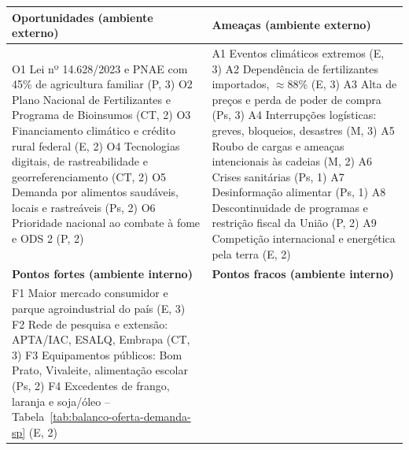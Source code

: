 \documentclass[
	12pt,				%
	openright,			%
	oneside,			%
	a4paper,			%
	chapter=TITLE,		%
	section=TITLE,		%
	english,			%
	french,				%
	spanish,			%
	brazil,				%
 ]{abntex2}
\begin{document}
\begin{quadro}[!htbp]
\centering
\caption{Sumário da análise SWOT: variáveis numeradas, Expressão e peso}
\label{qua:sumario-swot}
\footnotesize
\renewcommand{\arraystretch}{1.05}
\setlength{\tabcolsep}{3pt}
\begin{tabularx}{\textwidth}{|>{\raggedright\arraybackslash}X|>{\raggedright\arraybackslash}X|}
\hline
\textbf{Oportunidades (ambiente externo)} & \textbf{Ameaças (ambiente externo)} \\
\hline
O1 Lei nº 14.628/2023 e PNAE com 45\% de agricultura familiar (P, 3) \newline
O2 Plano Nacional de Fertilizantes e Programa de Bioinsumos (CT, 2) \newline
O3 Financiamento climático e crédito rural federal (E, 2) \newline
O4 Tecnologias digitais, de rastreabilidade e georreferenciamento (CT, 2) \newline
O5 Demanda por alimentos saudáveis, locais e rastreáveis (Ps, 2) \newline
O6 Prioridade nacional ao combate à fome e ODS 2 (P, 2)
&
A1 Eventos climáticos extremos (E, 3) \newline
A2 Dependência de fertilizantes importados, $\approx$88\% (E, 3) \newline
A3 Alta de preços e perda de poder de compra (Ps, 3) \newline
A4 Interrupções logísticas: greves, bloqueios, desastres (M, 3) \newline
A5 Roubo de cargas e ameaças intencionais às cadeias (M, 2) \newline
A6 Crises sanitárias (Ps, 1) \quad A7 Desinformação alimentar (Ps, 1) \newline
A8 Descontinuidade de programas e restrição fiscal da União (P, 2) \newline
A9 Competição internacional e energética pela terra (E, 2) \\
\hline
\textbf{Pontos fortes (ambiente interno)} & \textbf{Pontos fracos (ambiente interno)} \\
\hline
F1 Maior mercado consumidor e parque agroindustrial do país (E, 3) \newline
F2 Rede de pesquisa e extensão: APTA/IAC, ESALQ, Embrapa (CT, 3) \newline
F3 Equipamentos públicos: Bom Prato, Vivaleite, alimentação escolar (Ps, 2) \newline
F4 Excedentes de frango, laranja e soja/óleo -- Tabela~\ref{tab:balanco-oferta-demanda-sp} (E, 2) \newline

\end{tabularx}
\end{quadro}
\end{document}
